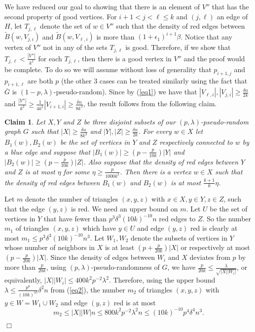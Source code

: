 \documentclass[11pt]{article}
\newenvironment{proof}
      {\medskip\noindent{\bf Proof.}\hspace{1mm}}
      {\hfill$\Box$\medskip}
\newtheorem{claim}[theorem]{Claim}
\begin{document}
\begin{proof}
We have reduced our goal to showing that there is an element of
$V''$ that has the second property of good vertices. For $i+1<j<\ell
\leq k$ and $(j,\ell)$ an edge of $H$, let $T_{j,\ell}$ denote the
set of $w \in V''$ such that the density of red edges between
$\tilde{B}(w,V_{j,i})$ and $\tilde{B}(w,V_{\ell,i})$ is more than
$(1+\epsilon_1)^{i+1}\beta$. Notice that any vertex of $V''$ not in
any of the sets $T_{j,\ell}$ is good. Therefore, if we show that
$T_{j,\ell} <\frac{|V''|}{k^2}$ for each $T_{j,\ell}$, then there is
a good vertex in $V''$ and the proof would be complete. To do so we
will assume without loss of generality that $p_{i+1,j}$ and
$p_{i+1,\ell}$ are both $p$ (the other 3 cases can be treated
similarly using the fact that $\bar G$ is
$(1-p,\lambda)$-pseudo-random). Since by (\ref{eq1}) we have that
$|V_{\ell,i}|, |V_{j,i}| \geq \frac{\delta n}{2k}$ and
$\frac{|V''|}{k^2} \geq \frac{1}{4k^2}|V_{i+1,i}| \geq \frac{\delta
n}{8k^3}$, the result follows from the following claim.


\begin{claim}
Let $X,Y$ and $Z$ be three disjoint subsets of our
$(p,\lambda)$-pseudo-random graph $G$ such that $|X| \geq
\frac{\delta n}{8k^3}$ and $|Y|,|Z| \geq \frac{\delta n}{2k}$. For
every $w \in X$ let $B_1(w), B_2(w)$ be the set of vertices in $Y$
and $Z$ respectively connected to $w$ by a blue edge and suppose
that $|B_1(w)|\geq (p-\frac{p}{10k})|Y|$ and $|B_2(w)| \geq
(p-\frac{p}{10k})|Z|$. Also suppose that the density of red edges
between $Y$ and $Z$ is at most $\eta$ for some $\eta \geq
\frac{p}{1000k^2}$. Then there is a vertex $w\in X$ such that the
density of red edges between $B_1(w)$ and $B_2(w)$ is at most
$\frac{k+1}{k}\eta$.
\end{claim}

 Let $m$ denote the number of triangles
$(x,y,z)$ with $x \in X, y \in Y, z \in Z$, such that the edge
$(y,z)$ is red. We need an upper bound on $m$. Let $U$ be the set of
vertices in $Y$ that have fewer than $p^3\delta^3(10k)^{-10}n$ red
edges to $Z$. So the number $m_1$ of triangles $(x,y,z)$ which have
$y\in U$ and edge $(y,z)$ red is clearly at most $m_1\leq
p^3\delta^3(10k)^{-10}n^3$. Let $W_1, W_2$ denote the subsets of
vertices in $Y$ whose number of neighbors in $X$ is at least
$(p+\frac{p}{20k})|X|$ or respectively at most
$(p-\frac{p}{20k})|X|$. Since the density of edges between $W_i$ and
$X$ deviates from $p$ by more than $\frac{p}{20k}$, using
$(p,\lambda)$-pseudo-randomness of $G$, we have $\frac{p}{20k} \leq
\frac{\lambda}{\sqrt{|X||W_i|}}$, or equivalently, $|X||W_i| \leq
400k^2p^{-2}\lambda^2.$ Therefore, using the upper bound $\lambda
\leq \frac{p^8}{(10k)^{10}}\delta^2n$ from (\ref{eq2}), the number
$m_2$ of triangles $(x,y,z)$ with $y \in W=W_1 \cup W_2$ and edge
$(y,z)$ red is at most
$$m_2 \leq |X||W|n \leq 800k^2p^{-2}\lambda^2n \leq (10k)^{-10}p^4\delta^4n^3.$$



\end{proof}
\end{document}
